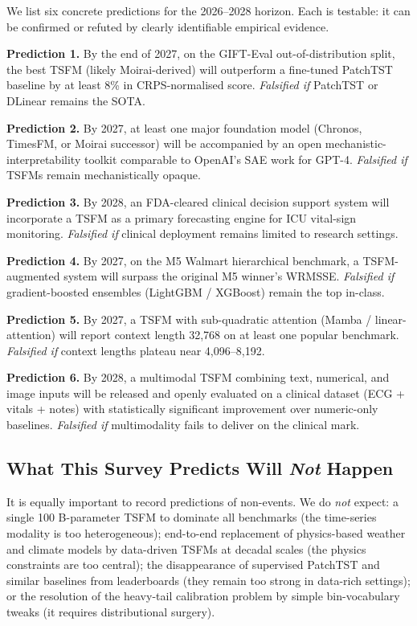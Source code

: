 \documentclass{article}
\begin{document}
We list six concrete predictions for the 2026--2028 horizon. Each is testable: it can be confirmed or refuted by clearly identifiable empirical evidence.

\textbf{Prediction 1.} By the end of 2027, on the GIFT-Eval out-of-distribution split, the best TSFM (likely Moirai-derived) will outperform a fine-tuned PatchTST baseline by at least 8\% in CRPS-normalised score. \emph{Falsified if} PatchTST or DLinear remains the SOTA.

\textbf{Prediction 2.} By 2027, at least one major foundation model (Chronos, TimesFM, or Moirai successor) will be accompanied by an open mechanistic-interpretability toolkit comparable to OpenAI's SAE work for GPT-4. \emph{Falsified if} TSFMs remain mechanistically opaque.

\textbf{Prediction 3.} By 2028, an FDA-cleared clinical decision support system will incorporate a TSFM as a primary forecasting engine for ICU vital-sign monitoring. \emph{Falsified if} clinical deployment remains limited to research settings.

\textbf{Prediction 4.} By 2027, on the M5 Walmart hierarchical benchmark, a TSFM-augmented system will surpass the original M5 winner's WRMSSE. \emph{Falsified if} gradient-boosted ensembles (LightGBM / XGBoost) remain the top in-class.

\textbf{Prediction 5.} By 2027, a TSFM with sub-quadratic attention (Mamba / linear-attention) will report context length 32,768 on at least one popular benchmark. \emph{Falsified if} context lengths plateau near 4,096--8,192.

\textbf{Prediction 6.} By 2028, a multimodal TSFM combining text, numerical, and image inputs will be released and openly evaluated on a clinical dataset (ECG + vitals + notes) with statistically significant improvement over numeric-only baselines. \emph{Falsified if} multimodality fails to deliver on the clinical mark.

\subsection{\texorpdfstring{What This Survey Predicts Will \emph{Not} Happen}{What This Survey Predicts Will Not Happen}}\label{what-this-survey-predicts-will-not-happen}

It is equally important to record predictions of non-events. We do \emph{not} expect: a single 100 B-parameter TSFM to dominate all benchmarks (the time-series modality is too heterogeneous); end-to-end replacement of physics-based weather and climate models by data-driven TSFMs at decadal scales (the physics constraints are too central); the disappearance of supervised PatchTST and similar baselines from leaderboards (they remain too strong in data-rich settings); or the resolution of the heavy-tail calibration problem by simple bin-vocabulary tweaks (it requires distributional surgery).
\end{document}
